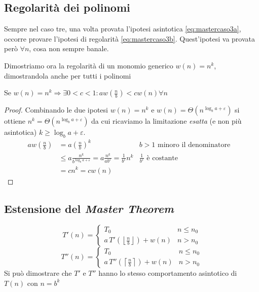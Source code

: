 \subsection{Regolarità dei polinomi}
Sempre nel caso tre, una volta provata l'ipotesi asintotica \ref{eq:mastercaso3a}, occorre provare l'ipotesi di regolarità \ref{eq:mastercaso3b}. Quest'ipotesi va provata però $\forall n$, cosa non sempre banale.

Dimostriamo ora la regolarità di un monomio generico $w(n) = n^k$, dimostrandola anche per tutti i polinomi

\begin{theorem} \label{teo:regolarita}
    Se $w(n) = n^k \Rightarrow \exists 0<c<1 : a w \left( \frac{n}{b} \right) < c w(n) \forall n$
\end{theorem}
\begin{proof}
    Combinando le due ipotesi $w(n)=n^k $ e $w(n)= \Theta \left( n^{\log_b a + \varepsilon} \right) $ si ottiene $n^k = \Theta \left( n^{\log_b a + \varepsilon} \right) $ da cui ricaviamo la limitazione \textit{esatta} (e non più asintotica) $k \geq \log_b a + \varepsilon$.
    \begin{align*}
        a w \left( \frac{n}{b} \right) &= a \left( \frac{n}{b} \right)^k 
        & b>1 \text{ minoro il denominatore} & \\
        & \leq a \frac{n^k}{b^{\log_b a + \varepsilon}} 
        = a \frac{n^k}{a b^{\varepsilon}} 
        = \frac{1}{b^{\varepsilon}} n^k
        & \frac{1}{b^{\varepsilon}} \text{ è costante} \\
        & = cn^k = cw(n)
    \end{align*}
\end{proof}

\subsection{Estensione del \textit{Master Theorem}}
\begin{equation}
    T'(n) = 
    \begin{cases} 
        T_0      &  n \leq n_0 \\
        a \, T' \left( \left\lfloor \frac{n}{b} \right\rfloor \right) + w(n) & n > n_0 
    \end{cases}
    \label{eq:masterestesofloor}
\end{equation}
\begin{equation}
    T''(n) = 
    \begin{cases} 
        T_0      &  n \leq n_0 \\
        a \, T''\left( \left\lceil \frac{n}{b} \right\rceil \right) + w(n) & n > n_0
    \end{cases}
    \label{eq:masterestesoceil}
\end{equation}
Si può dimostrare che $T' \text{ e } T''$ hanno lo stesso comportamento asintotico di $T(n)$ con $n=b^k$

